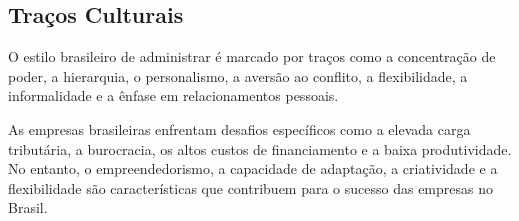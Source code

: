 \documentclass{article}
\begin{document}
\subsection{Traços Culturais}
O estilo brasileiro de administrar é marcado por traços como a concentração de poder, a hierarquia, o personalismo, a aversão ao conflito, a flexibilidade, a informalidade e a ênfase em relacionamentos pessoais.

As empresas brasileiras enfrentam desafios específicos como a elevada carga tributária, a burocracia, os altos custos de financiamento e a baixa produtividade. No entanto, o empreendedorismo, a capacidade de adaptação, a criatividade e a flexibilidade são características que contribuem para o sucesso das empresas no Brasil.
\end{document}
